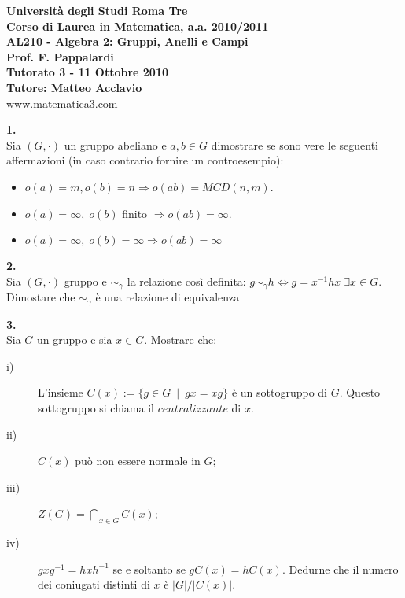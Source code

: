 \documentclass[italian,a4paper,11pt]
{article}
\newcommand{\acc}{\`}
\begin{document}
\begin{center}

\textbf{Universit\`a degli Studi Roma Tre}\\

\textbf{Corso di Laurea in Matematica, a.a. 2010/2011}\\

\textbf{AL210 - Algebra 2: Gruppi, Anelli e Campi}\\

\textbf{Prof. F. Pappalardi}\\

\textbf{Tutorato 3 - 11 Ottobre 2010}\\

\textbf{Tutore: Matteo Acclavio}\\

www.matematica3.com\\
\end{center}

\vspace{0.2cm}
\noindent
\begin{Ex}\textbf{ 1.}\\
Sia $(G, \cdot)$ un gruppo abeliano e $a,b \in G$ dimostrare se sono vere le seguenti affermazioni (in caso contrario fornire un controesempio):
\begin{itemize}
\item $o(a)=m, o(b)=n \Rightarrow o(ab)=MCD(n,m)$.
\item $o(a)=\infty,\; o(b)$ finito $\Rightarrow o(ab)=\infty$.
\item $o(a)=\infty ,\; o(b)=\infty \Rightarrow o(ab)=\infty $
\end{itemize}
\end{Ex}

\vspace{0.2cm}
\noindent
\begin{Ex}\textbf{ 2.}\\
Sia $(G,\cdot )$ gruppo e $\sim_\gamma$ la relazione cos\acc i definita:
$g \sim _\gamma h \Leftrightarrow g=x^{-1}hx\;\exists x \in G$.\\
Dimostare che $\sim_\gamma$  \acc e una relazione di equivalenza
\end{Ex}

\vspace{0.2cm}
\noindent
\begin{Ex}\textbf{ 3.}\\
Sia $G$ un gruppo e sia $x\in G$. Mostrare che:
\begin{description}
	\item[i)] L'insieme $C(x):=\{g\in G\ \mid \ gx=xg\}$ \acc e un sottogruppo di $G$. Questo sottogruppo si chiama  il $centralizzante$ di $x$.
		\item[ii)] $C(x)$ pu\acc o non essere normale in $G$;
		\item[iii)] $Z(G)=\displaystyle \bigcap_{x\in G} C(x)$;
		\item[iv)] $gxg^{-1}=hxh^{-1}$ se e soltanto se $gC(x)=hC(x)$. Dedurne che il numero dei coniugati distinti di $x$ \acc e $\left|G\right| /\left| C(x)\right|$.
		\end{description}
\end{Ex}
\end{document}
